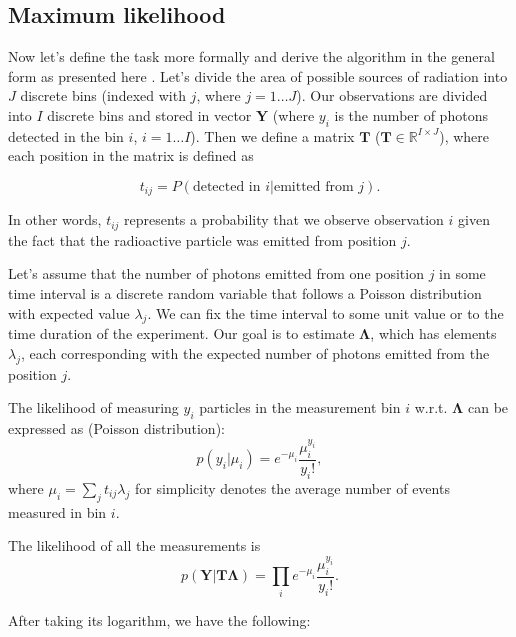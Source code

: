 
\subsection{Maximum likelihood}
Now let's define the task more formally and derive the algorithm in the general form as presented here \cite{}.
Let's divide the area of possible sources of radiation into $J$ discrete bins (indexed with $j$, where $j = 1 \dotsc J$).
Our observations are divided into $I$ discrete bins and stored in vector $\mathbf{Y}$ (where $y_{i}$ is the number of photons detected in the bin $i$, $i = 1 \dotsc I$).
Then we define a matrix $\mathbf{T}$ ($\mathbf{T} \in \mathbb{R}^{I \times J}$), where each position in the matrix is defined as

\begin{equation}
  t_{ij} =  P(\textrm{detected in } i | \textrm{emitted from } j).
\end{equation}

In other words, $t_{ij}$ represents a probability that we observe observation $i$ given the fact that the radioactive particle was emitted from position $j$.

Let's assume that the number of photons emitted from one position $j$ in some time interval is a discrete random variable that follows a Poisson distribution with expected value $\lambda_{j}$.
We can fix the time interval to some unit value or to the time duration of the experiment.
Our goal is to estimate $\mathbf{\Lambda}$, which has elements $\lambda_{j}$, each corresponding with the expected number of photons emitted from the position $j$.

The likelihood of measuring $y_{i}$ particles in the measurement bin $i$ w.r.t. $\mathbf{\Lambda}$ can be expressed as (Poisson distribution):
\begin{equation}
  p(y_{i} |\mu_{i} ) = e^{-\mu_{i}} \frac{\mu_{i}^{y_i}}{y_{i}!},
\end{equation}
where $\mu_{i} = \sum_{j} t_{ij}\lambda_{j}$ for simplicity denotes the average number of events measured in bin $i$.

The likelihood of all the measurements is
\begin{equation}  
  p(\mathbf{Y} | \mathbf{T\Lambda} ) = \prod_{i} e^{-\mu_{i}} \frac{\mu_{i}^{y_i}}{y_{i}!}.
\end{equation}

After taking its logarithm, we have the following:

